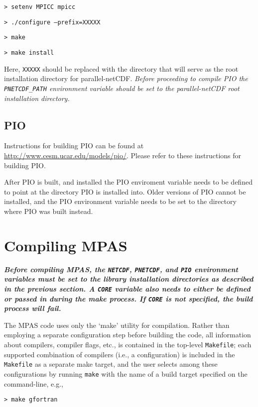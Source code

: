 {\tt > setenv MPICC mpicc}  

{\tt > ./configure --prefix=XXXXX} 

{\tt > make}

{\tt > make install}
\vspace{12pt}

Here, {\tt XXXXX} should be replaced with the directory that will serve as the root installation directory for parallel-netCDF.
{\em Before proceeding to compile PIO the {\tt PNETCDF\_PATH} environment variable should be set to the parallel-netCDF root installation directory.}


\subsection{PIO}

Instructions for building PIO can be found at \url{http://www.cesm.ucar.edu/models/pio/}. Please refer to these instructions for building PIO.

After PIO is built, and installed the PIO enviroment variable needs to be
defined to point at the directory PIO is installed into. Older versions of PIO
cannot be installed, and the PIO environment variable needs to be set to the
directory where PIO was built instead.

\section{Compiling MPAS}

{\bf \em Before compiling MPAS, the {\tt NETCDF}, {\tt PNETCDF}, and {\tt PIO} environment variables must be set to the library installation directories as
described in the previous section. A {\tt CORE} variable also needs to either be defined or passed in during the make process. If {\tt CORE} is not specified, 
the build process will fail.}

The MPAS code uses only the `make' utility for compilation. Rather than employing a separate configuration step
before building the code, all information about compilers, compiler flags, etc., is contained in the top-level {\tt Makefile}; each
supported combination of compilers (i.e., a configuration) is included in the {\tt Makefile} as a separate make target, and the user selects among
these configurations by running {\tt make} with the name of a build target specified on the command-line, e.g.,

\vspace{12pt}
{\tt > make gfortran}
\vspace{12pt}

